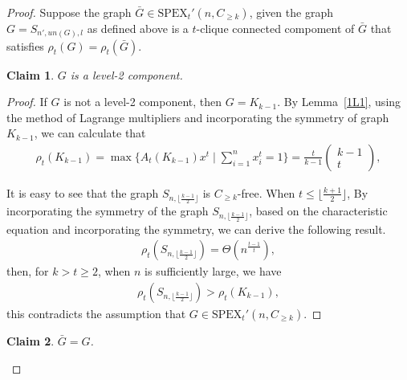 \documentclass[preprint,12pt]{elsarticle}
\newtheorem{claim}{Claim}[thm]
\begin{document}
        \begin{proof}


            Suppose the graph $\bar{G} \in \mathrm{SPEX}_t'(n,C_{\geq k}) $, given the graph $G = S_{n',un(G),l} $ as defined above is a $t$-clique connected compoment of $\bar{G} $ that satisfies $\rho_t(G) = \rho_t(\bar{G})$.

            \begin{claim}\label{CC4}
                $G$ is a level-2 component.
            \end{claim}

            \begin{proof}
                If $G$ is not a level-2 component, then $G = K_{k-1} $. By Lemma~\ref{1L1}, using the method of Lagrange multipliers and incorporating the symmetry of graph $K_{k-1}$, we can calculate that
                    \begin{align*}
                        \rho_t(K_{k-1}) = \max\{A_t(K_{k-1})x^t \mid \sum_{i=1}^{n} x_i^t = 1\} = \frac{t}{k-1}\begin{pmatrix}k-1\\t\end{pmatrix},
                    \end{align*}

                It is easy to see that the graph $S_{n,\lfloor \frac{k-1}{2} \rfloor}$ is $C_{\geq k}$-free. When $t \leq \lfloor \frac{k+1}{2} \rfloor$, By incorporating the symmetry of the graph $S_{n,\lfloor \frac{k-1}{2} \rfloor}$, based on the characteristic equation and incorporating the symmetry, we can derive the following result.
                    \begin{align*}
                        \rho_t(S_{n,\lfloor \frac{k-1}{2} \rfloor}) = \Theta(n^{\frac{t-1}{t}}),
                    \end{align*}
                then, for $k > t \geq 2$, when $n$ is sufficiently large, we have
                    \begin{align*}
                        \rho_t(S_{n,\lfloor \frac{k-1}{2} \rfloor}) > \rho_t(K_{k-1}),
                    \end{align*}
                this contradicts the assumption that $G \in \mathrm{SPEX}_t'(n, C_{\geq k})$.
            \end{proof}



            \begin{claim}\label{CC5}
                $\bar{G} = G$.
            \end{claim}


\end{proof}
\end{document}
